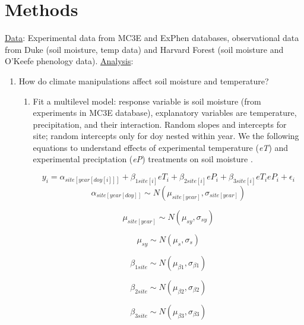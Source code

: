 \documentclass{article}
\begin{document}
\section* {Methods}
\begin{singlespace}
\underline{Data}: Experimental data from MC3E and ExPhen databases, observational data from Duke (soil moisture, temp data) and Harvard Forest (soil moisture and O'Keefe phenology data). 
\underline{Analysis}:
\begin{enumerate}
\item How do climate manipulations affect soil moisture and temperature?
\begin{enumerate}
\item Fit a multilevel model: response variable is soil moisture (from experiments in MC3E database), explanatory variables are temperature, precipitation, and their interaction. Random slopes and intercepts for site; random intercepts only for doy nested within year. We the following equations to understand effects of experimental temperature (\textit{eT}) and experimental preciptation (\textit{eP}) treatments on soil moisture . 

\begin{equation}
y_{i}=\alpha_{site[year[doy[i]]]}+ \beta_{1 site[i]}eT_i+\beta_{2 site[i]}eP_i+\beta_{3 site[i]}eT_ieP_i+\epsilon_{i}
\end{equation}
\begin{equation}
\alpha_{site[year[doy]]}\sim N(\mu_{site[year]}, \sigma_{site[year]})
\end{equation}

\begin{equation}
\mu_{site[year]} \sim N(\mu_{sy}, \sigma_{sy})
\end{equation}

\begin{equation}
\mu_{sy} \sim N(\mu_{s}, \sigma_{s})
\end{equation}

\begin{equation}
\beta_{1 site} \sim N(\mu_{\beta1}, \sigma_{\beta1})
\end{equation}

\begin{equation}
\beta_{2 site} \sim N(\mu_{\beta2}, \sigma_{\beta2})
\end{equation}

\begin{equation}
\beta_{3 site} \sim N(\mu_{\beta3}, \sigma_{\beta3})
\end{equation}
\end{enumerate}


\end{enumerate}
\end{singlespace}
\end{document}
